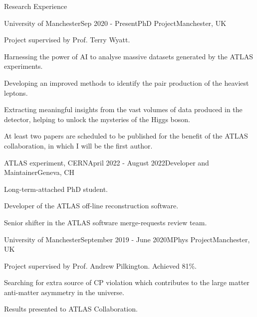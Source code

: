 \documentclass{resume} %
\begin{document}
    \begin{rSection}{Research Experience}
        \begin{rSubsection}{University of Manchester}{Sep 2020 - Present}{PhD Project}{Manchester, UK}
            \item Project supervised by Prof. Terry Wyatt.
            \item Harnessing the power of AI to analyse massive datasets generated by the ATLAS experiments. 
            \item Developing an improved methods to identify the pair production of the heaviest leptons.
            \item Extracting meaningful insights from the vast volumes of data produced in the detector, helping to unlock the mysteries of the Higgs boson.
            \item At least two papers are scheduled to be published for the benefit of the ATLAS collaboration, in which I will be the first author.
        \end{rSubsection}
        \begin{rSubsection}{ATLAS experiment, CERN}{April 2022 - August 2022}{Developer and Maintainer}{Geneva, CH}
            \item Long-term-attached PhD student.
            \item Developer of the ATLAS off-line reconstruction software.
            \item Senior shifter in the ATLAS software merge-requests review team.
        \end{rSubsection}
        \begin{rSubsection}{University of Manchester}{September 2019 - June 2020}{MPhys Project}{Manchester, UK}
            \item   Project supervised by Prof. Andrew Pilkington. Achieved 81\%.
            \item   Searching for extra source of CP violation which contributes to the large matter anti-matter asymmetry in the universe.
            \item   Results presented to ATLAS Collaboration. 
        \end{rSubsection}
    \end{rSection}
\end{document}
